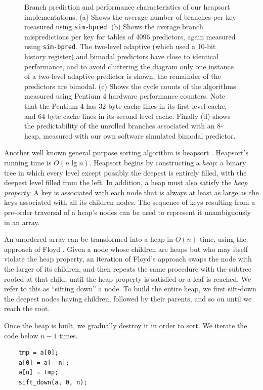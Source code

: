 \documentclass[acmtocl]{acmtrans2m}
\begin{document}
\begin{figure}
\caption{Branch prediction and performance characteristics of our heapsort implementations. (a) Shows
the average number of branches per key measured using \texttt{sim-bpred}. (b) Shows the average branch mispredictions per key for tables of 4096
predictors, again measured using \texttt{sim-bpred}. The two-level adaptive (which used a 10-bit history register) and bimodal predictors have close to identical performance, and to avoid
cluttering the diagram only one instance of a two-level adaptive predictor is shown, the remainder of the predictors are bimodal. (c) Shows the cycle counts of the algorithms measured using
Pentium 4 hardware performance counters. Note that the Pentium 4 has 32 byte cache lines in its first level cache, and 64 byte cache lines in its
second level cache.
Finally (d) shows the predictability of the unrolled branches associated with an 8-heap, measured with our own software simulated bimodal predictor.}
\label{heapsort_results}
\end{figure}

Another well known general purpose sorting algorithm is heapsort \cite{Williams64}. Heapsort's running time is $O(n \lg n)$.
Heapsort begins by constructing a \textit{heap}: a binary tree in which every level except possibly the deepest is entirely filled, with the deepest level filled from the
left. In addition, a heap must also satisfy the \textit{heap property}: A key is associated with each node that is always at least as large as the keys 
associated with all its children nodes. The sequence of keys resulting from a pre-order traversal of a heap's nodes can be used to represent it unambiguously in an array. 

An unordered array can be transformed into a heap in $O(n)$ time, using the approach of Floyd \citeyear{Floyd64}.
Given a node whose children are heaps but who may itself
violate the heap property, an iteration of Floyd's approach swaps the node with the larger of its children, and then repeats the same procedure 
with the subtree rooted at that child, until the heap property is satisfied or a leaf is reached. We refer to this as ``sifting down'' a node. 
To build the entire heap, we first sift-down the deepest nodes having children, followed by their
parents, and so on until we reach the root.

Once the heap is built, we gradually destroy it in order to sort. We iterate the code below $n - 1$ times. 

\begin{verbatim}
    tmp = a[0];
    a[0] = a[--n];
    a[n] = tmp;    
    sift_down(a, 0, n);
\end{verbatim}
\end{document}
